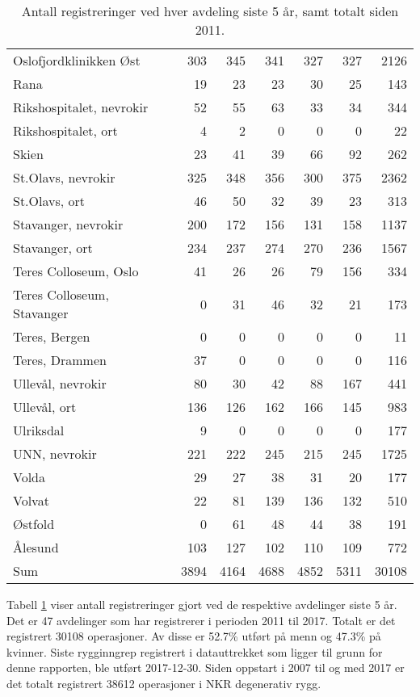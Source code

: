 \begin{table}[ht]
\begin{tabular}{lrrrrrr}
  Oslofjordklinikken Øst & 303 & 345 & 341 & 327 & 327 & 2126 \\ 
  Rana & 19 & 23 & 23 & 30 & 25 & 143 \\ 
  Rikshospitalet, nevrokir & 52 & 55 & 63 & 33 & 34 & 344 \\ 
  Rikshospitalet, ort & 4 & 2 & 0 & 0 & 0 & 22 \\ 
  Skien & 23 & 41 & 39 & 66 & 92 & 262 \\ 
  St.Olavs, nevrokir & 325 & 348 & 356 & 300 & 375 & 2362 \\ 
  St.Olavs, ort & 46 & 50 & 32 & 39 & 23 & 313 \\ 
  Stavanger, nevrokir & 200 & 172 & 156 & 131 & 158 & 1137 \\ 
  Stavanger, ort & 234 & 237 & 274 & 270 & 236 & 1567 \\ 
  Teres Colloseum, Oslo & 41 & 26 & 26 & 79 & 156 & 334 \\ 
  Teres Colloseum, Stavanger & 0 & 31 & 46 & 32 & 21 & 173 \\ 
  Teres, Bergen & 0 & 0 & 0 & 0 & 0 & 11 \\ 
  Teres, Drammen & 37 & 0 & 0 & 0 & 0 & 116 \\ 
  Ullevål, nevrokir & 80 & 30 & 42 & 88 & 167 & 441 \\ 
  Ullevål, ort & 136 & 126 & 162 & 166 & 145 & 983 \\ 
  Ulriksdal & 9 & 0 & 0 & 0 & 0 & 177 \\ 
  UNN, nevrokir & 221 & 222 & 245 & 215 & 245 & 1725 \\ 
  Volda & 29 & 27 & 38 & 31 & 20 & 177 \\ 
  Volvat & 22 & 81 & 139 & 136 & 132 & 510 \\ 
  Østfold & 0 & 61 & 48 & 44 & 38 & 191 \\ 
  Ålesund & 103 & 127 & 102 & 110 & 109 & 772 \\ 
  Sum & 3894 & 4164 & 4688 & 4852 & 5311 & 30108 \\ 
   \hline
\end{tabular}
\caption{Antall registreringer ved hver avdeling siste 5 år, samt totalt siden 2011.} 
\label{tab:AntReg}
\end{table}


Tabell \ref{tab:AntReg} viser antall 
registreringer gjort ved de respektive avdelinger siste 5 år. Det er  
47 avdelinger som har registrerer i perioden 2011 til 2017. Totalt er det registrert 30108 
operasjoner. Av disse er 52.7\% utført på menn og 47.3\% på kvinner.
Siste rygginngrep registrert i datauttrekket som ligger til grunn for denne rapporten, ble utført 
2017-12-30. Siden oppstart i 2007 til og med 2017 er det totalt registrert 38612 operasjoner i NKR degenerativ rygg. 
\par

